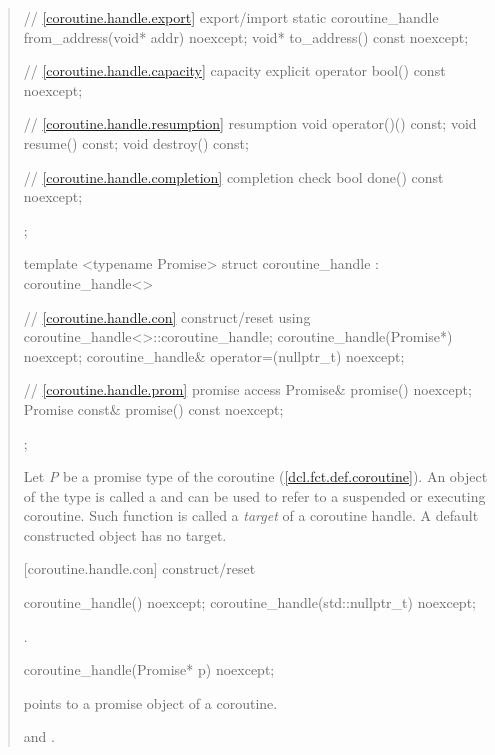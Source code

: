 \begin{quote}
\begin{codeblock}
{{{      // \ref{coroutine.handle.export} export/import
      static coroutine_handle from_address(void* addr) noexcept;		
      void* to_address() const noexcept;
      
      // \ref{coroutine.handle.capacity} capacity
      explicit operator bool() const noexcept;
      
      // \ref{coroutine.handle.resumption} resumption
      void operator()() const;
      void resume() const;	
      void destroy() const;
      
      // \ref{coroutine.handle.completion} completion check
      bool done() const noexcept; 
    };
    
    template <typename Promise>
    struct coroutine_handle : coroutine_handle<>
    {
      // \ref{coroutine.handle.con} construct/reset
      using coroutine_handle<>::coroutine_handle;
      coroutine_handle(Promise*) noexcept;		
      coroutine_handle& operator=(nullptr_t) noexcept;
      
      // \ref{coroutine.handle.prom} promise access
      Promise& promise() noexcept;		
      Promise const& promise() const noexcept;
    };
  }
}
\end{codeblock}

\pnum
Let \textit{P} be a promise type of the coroutine (\ref{dcl.fct.def.coroutine}). An object of the type  is called a 
and can be used to refer to a suspended or executing coroutine.
Such function is called a \textit{target} of a coroutine handle.
A default constructed  object has no target.


[coroutine.handle.con]{ construct/reset}
\begin{itemdecl}
  coroutine_handle() noexcept;		
  coroutine_handle(std::nullptr_t) noexcept;
\end{itemdecl}
\begin{itemdescr}
  \pnum\postconditions {}.
\end{itemdescr}

\begin{itemdecl}
  coroutine_handle(Promise* p) noexcept;	
\end{itemdecl}
\begin{itemdescr}
  \pnum
  \precondition {} points to a promise object of a coroutine.
  
	\pnum
  \postconditions {} and .
\end{itemdescr}


\end{quote}
